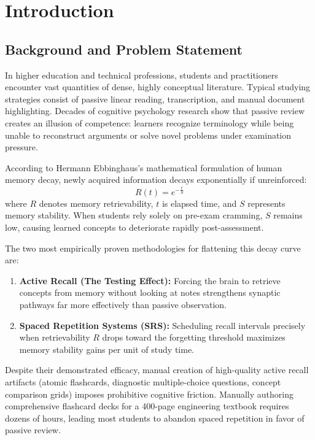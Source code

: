 \documentclass[12pt,a4paper,oneside]{report}
\begin{document}
\newpage
{}

\chapter{Introduction}

\section{Background and Problem Statement}
In higher education and technical professions, students and practitioners encounter vast quantities of dense, highly conceptual literature. Typical studying strategies consist of passive linear reading, transcription, and manual document highlighting. Decades of cognitive psychology research show that passive review creates an illusion of competence: learners recognize terminology while being unable to reconstruct arguments or solve novel problems under examination pressure.

According to Hermann Ebbinghaus's mathematical formulation of human memory decay, newly acquired information decays exponentially if unreinforced:
\begin{equation}
    R(t) = e^{-\frac{t}{S}}
\end{equation}
where $R$ denotes memory retrievability, $t$ is elapsed time, and $S$ represents memory stability. When students rely solely on pre-exam cramming, $S$ remains low, causing learned concepts to deteriorate rapidly post-assessment. 

The two most empirically proven methodologies for flattening this decay curve are:
\begin{enumerate}
    \item \textbf{Active Recall (The Testing Effect):} Forcing the brain to retrieve concepts from memory without looking at notes strengthens synaptic pathways far more effectively than passive observation.
    \item \textbf{Spaced Repetition Systems (SRS):} Scheduling recall intervals precisely when retrievability $R$ drops toward the forgetting threshold maximizes memory stability gains per unit of study time.
\end{enumerate}

Despite their demonstrated efficacy, manual creation of high-quality active recall artifacts (atomic flashcards, diagnostic multiple-choice questions, concept comparison grids) imposes prohibitive cognitive friction. Manually authoring comprehensive flashcard decks for a 400-page engineering textbook requires dozens of hours, leading most students to abandon spaced repetition in favor of passive review.
\end{document}
